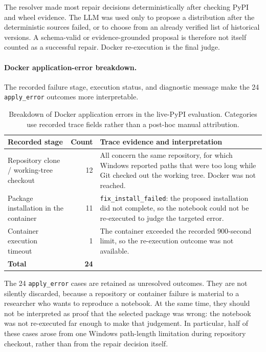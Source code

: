 The resolver made most repair decisions deterministically after checking PyPI
and wheel evidence. The LLM was used only to propose a distribution after the
deterministic sources failed, or to choose from an already verified list of
historical versions. A schema-valid or evidence-grounded proposal is therefore
not itself counted as a successful repair. Docker re-execution is the final
judge.

\paragraph{Docker application-error breakdown.}
The recorded failure stage, execution status, and diagnostic message make the
24 \texttt{apply\_error} outcomes more interpretable.

\begin{table}[htbp]
  \centering
  \small
  \setlength{\tabcolsep}{3pt}
  \begin{tabular}{|p{3.3cm}|r|p{6.6cm}|}
    \hline
    \textbf{Recorded stage} & \textbf{Count} & \textbf{Trace evidence and interpretation} \\
    \hline
    Repository clone / working-tree checkout & 12 & All concern the same repository, for which Windows reported paths that were too long while Git checked out the working tree. Docker was not reached. \\
    \hline
    Package installation in the container & 11 & \texttt{fix\_install\_failed}: the proposed installation did not complete, so the notebook could not be re-executed to judge the targeted error. \\
    \hline
    Container execution timeout & 1 & The container exceeded the recorded 900-second limit, so the re-execution outcome was not available. \\
    \hline
    \textbf{Total} & \textbf{24} & \\
    \hline
  \end{tabular}
  \caption{Breakdown of Docker application errors in the live-PyPI evaluation.
  Categories use recorded trace fields rather than a post-hoc manual
  attribution.}
  \label{tab:v-application-errors}
\end{table}

The 24 \texttt{apply\_error} cases are retained as unresolved outcomes. They
are not silently discarded, because a repository or container failure is
material to a researcher who wants to reproduce a notebook. At the same time,
they should not be interpreted as proof that the selected package was wrong:
the notebook was not re-executed far enough to make that judgement. In
particular, half of these cases arose from one Windows path-length limitation
during repository checkout, rather than from the repair decision itself.
\label{sec:v-final-infra}

